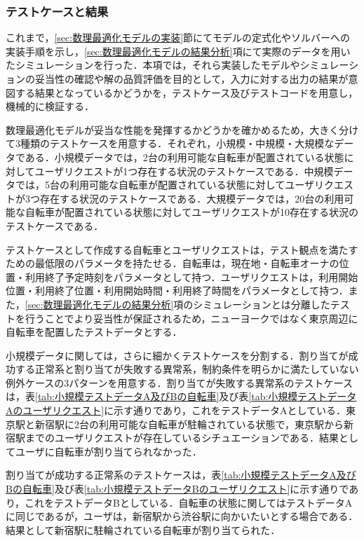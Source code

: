       \subsubsection{テストケースと結果}
        \label{sec:テストケースと結果}
          \par これまで，\ref{sec:数理最適化モデルの実装}節にてモデルの定式化やソルバーへの実装手順を示し，\ref{sec:数理最適化モデルの結果分析}項にて実際のデータを用いたシミュレーションを行った．本項では，それら実装したモデルやシミュレーションの妥当性の確認や解の品質評価を目的として，入力に対する出力の結果が意図する結果となっているかどうかを，テストケース及びテストコードを用意し，機械的に検証する．
          \par 数理最適化モデルが妥当な性能を発揮するかどうかを確かめるため，大きく分けて3種類のテストケースを用意する．それぞれ，小規模・中規模・大規模なデータである．小規模データでは，2台の利用可能な自転車が配置されている状態に対してユーザリクエストが1つ存在する状況のテストケースである．中規模データでは，5台の利用可能な自転車が配置されている状態に対してユーザリクエストが3つ存在する状況のテストケースである．大規模データでは，20台の利用可能な自転車が配置されている状態に対してユーザリクエストが10存在する状況のテストケースである．
          \par テストケースとして作成する自転車とユーザリクエストは，テスト観点を満たすための最低限のパラメータを持たせる．自転車は，現在地・自転車オーナの位置・利用終了予定時刻をパラメータとして持つ．ユーザリクエストは，利用開始位置・利用終了位置・利用開始時間・利用終了時間をパラメータとして持つ．また，\ref{sec:数理最適化モデルの結果分析}項のシミュレーションとは分離したテストを行うことでより妥当性が保証されるため，ニューヨークではなく東京周辺に自転車を配置したテストデータとする．
          \par 小規模データに関しては，さらに細かくテストケースを分割する．割り当てが成功する正常系と割り当てが失敗する異常系，制約条件を明らかに満たしていない例外ケースの3パターンを用意する．割り当てが失敗する異常系のテストケースは，表\ref{tab:小規模テストデータA及びBの自転車}及び表\ref{tab:小規模テストデータAのユーザリクエスト}に示す通りであり，これをテストデータAとしている．東京駅と新宿駅に2台の利用可能な自転車が駐輪されている状態で，東京駅から新宿駅までのユーザリクエストが存在しているシチュエーションである．結果としてユーザに自転車が割り当てられなかった．
          \par 割り当てが成功する正常系のテストケースは，表\ref{tab:小規模テストデータA及びBの自転車}及び表\ref{tab:小規模テストデータBのユーザリクエスト}に示す通りであり，これをテストデータBとしている．自転車の状態に関してはテストデータAに同じであるが，ユーザは，新宿駅から渋谷駅に向かいたいとする場合である．結果として新宿駅に駐輪されている自転車が割り当てられた．
